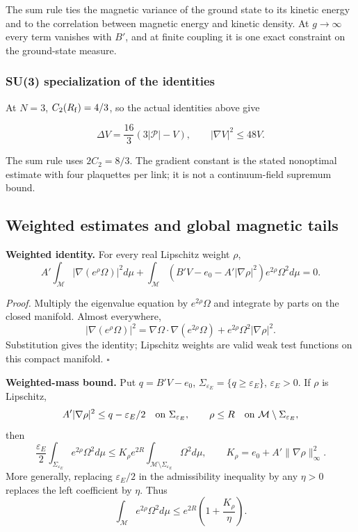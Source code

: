 \documentclass[11pt,a4paper]{article}
\begin{document}
The sum rule ties the magnetic variance of the ground state to its
kinetic energy and to the correlation between magnetic energy and
kinetic density. At \(g\to\infty\) every term vanishes with \(B'\), and
at finite coupling it is one exact constraint on the ground-state
measure.

\hypertarget{su3-specialization-of-the-identities}{%
\subsubsection{SU(3) specialization of the
identities}\label{su3-specialization-of-the-identities}}

At \(N=3\), \(C_2(R_{\rm f})=4/3\), so the actual identities above give

\[\Delta V=\frac{16}{3}(3|\mathcal P|-V),\qquad
 |\nabla V|^2\le48V.\]

The sum rule uses \(2C_2=8/3\). The gradient constant is the stated
nonoptimal estimate with four plaquettes per link; it is not a
continuum-field supremum bound.

\hypertarget{weighted-estimates-and-global-magnetic-tails}{%
\subsection{Weighted estimates and global magnetic
tails}\label{weighted-estimates-and-global-magnetic-tails}}

\textbf{Weighted identity.} For every real Lipschitz weight \(\rho\),
\[A'\int_{\mathcal M}|\nabla(e^\rho\Omega)|^2d\mu
+\int_{\mathcal M}(B'V-e_0-A'|\nabla\rho|^2)e^{2\rho}\Omega^2d\mu=0.\]

\emph{Proof.} Multiply the eigenvalue equation by \(e^{2\rho}\Omega\)
and integrate by parts on the closed manifold. Almost everywhere,
\[|\nabla(e^\rho\Omega)|^2
=\nabla\Omega\cdot\nabla(e^{2\rho}\Omega)
+e^{2\rho}\Omega^2|\nabla\rho|^2.\] Substitution gives the identity;
Lipschitz weights are valid weak test functions on this compact
manifold. \(\square\)

\textbf{Weighted-mass bound.} Put \(q=B'V-e_0\),
\(\Sigma_{\varepsilon_E}=\{q\ge\varepsilon_E\}\), \(\varepsilon_E>0\).
If \(\rho\) is Lipschitz,
\[A'|\nabla\rho|^2\le q-\varepsilon_E/2\quad\hbox{on }\Sigma_{\varepsilon_E},
\qquad \rho\le R\quad\hbox{on }\mathcal M\setminus\Sigma_{\varepsilon_E},\]
then
\[\frac{\varepsilon_E}{2}\int_{\Sigma_{\varepsilon_E}}e^{2\rho}\Omega^2d\mu
\le K_\rho e^{2R}\int_{\mathcal M\setminus\Sigma_{\varepsilon_E}}\Omega^2d\mu,
\qquad K_\rho=e_0+A'\|\nabla\rho\|_\infty^2.\] More generally, replacing
\(\varepsilon_E/2\) in the admissibility inequality by any \(\eta>0\)
replaces the left coefficient by \(\eta\). Thus
\[\int_{\mathcal M}e^{2\rho}\Omega^2d\mu
\le e^{2R}\left(1+\frac{K_\rho}{\eta}\right).\]
\end{document}
